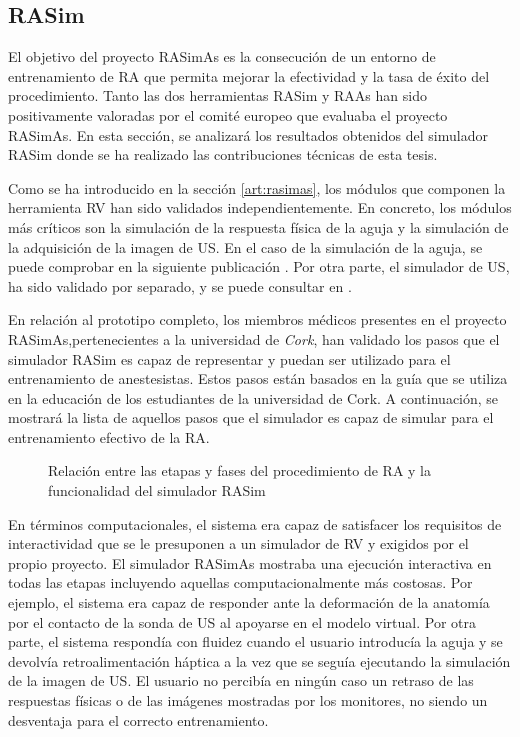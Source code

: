\subsection{RASim}
\label{result:rasim}

El objetivo del proyecto \ac{RASimAs} es la consecución de un entorno de entrenamiento de \ac{RA} que permita mejorar la efectividad y la tasa de éxito del procedimiento. Tanto las dos herramientas \ac{RASim} y \ac{RAAs} han sido positivamente valoradas por el comité europeo que evaluaba el proyecto \ac{RASimAs}. En esta sección, se analizará los resultados obtenidos del simulador \ac{RASim} donde se ha realizado las contribuciones técnicas de esta tesis.

Como se ha introducido en la sección \ref{art:rasimas}, los módulos que componen la herramienta \ac{RV} han sido validados independientemente. En concreto, los módulos más críticos son la simulación de la respuesta física de la aguja y la simulación de la adquisición de la imagen de \ac{US}. 
En el caso de la simulación de la aguja, se puede comprobar en la siguiente publicación  \cite{asdf}.
Por otra parte, el simulador de \ac{US}, ha sido validado por separado, y se puede consultar en \cite{asdf}.

En relación al prototipo completo, los miembros médicos presentes en el proyecto \ac{RASimAs},pertenecientes a la universidad de \emph{Cork}, han validado los pasos que el simulador \ac{RASim} es capaz de representar y puedan ser utilizado para el entrenamiento de anestesistas. Estos pasos están basados en la guía que se utiliza en la educación de los estudiantes de la universidad de Cork.
A continuación, se mostrará la lista de aquellos pasos que el simulador es capaz de simular para el entrenamiento efectivo de la \ac{RA}.

\begin{figure}
    \centering
        \caption{Relación entre las etapas y fases del procedimiento de \ac{RA} y la funcionalidad del simulador \ac{RASim} }
    \label{fig:RAsteps}
\end{figure}

En términos computacionales, el sistema era capaz de satisfacer los requisitos de interactividad que se le presuponen a un simulador de \ac{RV} y exigidos por el propio proyecto. El simulador \ac{RASimAs} mostraba una ejecución interactiva en todas las etapas incluyendo aquellas computacionalmente más costosas. Por ejemplo, el sistema era capaz de responder ante la deformación de la anatomía por el contacto de la sonda de \ac{US} al apoyarse en el modelo virtual. Por otra parte, el sistema respondía con fluidez cuando el usuario introducía la aguja y se devolvía retroalimentación háptica a la vez que se seguía ejecutando la simulación de la imagen de \ac{US}. El usuario no percibía en ningún caso un retraso de las respuestas físicas o de las imágenes mostradas por los monitores, no siendo un desventaja para el correcto entrenamiento.

